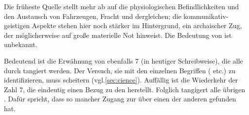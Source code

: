 \label{sec:com}




Die früheste Quelle stellt mehr ab auf die physiologischen Befindlichkeiten und den Austausch von Fahrzeugen, Fracht und dergleichen; die kommunikativ-geistigen Aspekte stehen hier noch stärker im Hintergrund, ein archaischer Zug, der möglicherweise auf große materielle Not hinweist. Die Bedeutung von  ist unbekannt.

Bedeutend ist die Erwähnung von ebenfalls 7  (in heutiger Schreibweise), die alle durch  tangiert werden.
Der Versuch, sie mit den einzelnen Begriffen ( etc.) zu identifizieren, muss scheitern (vgl.\cref{sec:cience}). Auffällig ist die Wiederkehr der Zahl 7, die eindeutig einen Bezug zu den  herstellt. Folglich tangigert  alle übrigen . Dafür spricht, dass so mancher Zugang zur  über einen der anderen  gefunden hat. 




